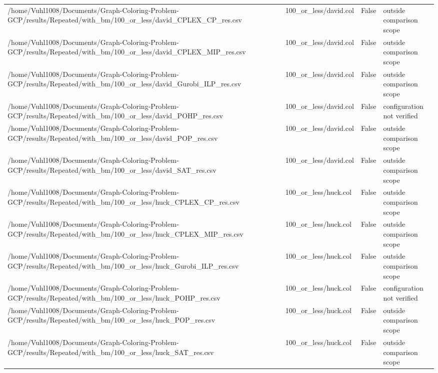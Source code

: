 \begin{table}[htbp]
\begin{tabular}{llll}
/home/Vuhl1008/Documents/Graph-Coloring-Problem-GCP/results/Repeated/with\_bm/100\_or\_less/david\_CPLEX\_CP\_res.csv & 100\_or\_less/david.col & False & outside comparison scope \\
/home/Vuhl1008/Documents/Graph-Coloring-Problem-GCP/results/Repeated/with\_bm/100\_or\_less/david\_CPLEX\_MIP\_res.csv & 100\_or\_less/david.col & False & outside comparison scope \\
/home/Vuhl1008/Documents/Graph-Coloring-Problem-GCP/results/Repeated/with\_bm/100\_or\_less/david\_Gurobi\_ILP\_res.csv & 100\_or\_less/david.col & False & outside comparison scope \\
/home/Vuhl1008/Documents/Graph-Coloring-Problem-GCP/results/Repeated/with\_bm/100\_or\_less/david\_POHP\_res.csv & 100\_or\_less/david.col & False & configuration not verified \\
/home/Vuhl1008/Documents/Graph-Coloring-Problem-GCP/results/Repeated/with\_bm/100\_or\_less/david\_POP\_res.csv & 100\_or\_less/david.col & False & outside comparison scope \\
/home/Vuhl1008/Documents/Graph-Coloring-Problem-GCP/results/Repeated/with\_bm/100\_or\_less/david\_SAT\_res.csv & 100\_or\_less/david.col & False & outside comparison scope \\
/home/Vuhl1008/Documents/Graph-Coloring-Problem-GCP/results/Repeated/with\_bm/100\_or\_less/huck\_CPLEX\_CP\_res.csv & 100\_or\_less/huck.col & False & outside comparison scope \\
/home/Vuhl1008/Documents/Graph-Coloring-Problem-GCP/results/Repeated/with\_bm/100\_or\_less/huck\_CPLEX\_MIP\_res.csv & 100\_or\_less/huck.col & False & outside comparison scope \\
/home/Vuhl1008/Documents/Graph-Coloring-Problem-GCP/results/Repeated/with\_bm/100\_or\_less/huck\_Gurobi\_ILP\_res.csv & 100\_or\_less/huck.col & False & outside comparison scope \\
/home/Vuhl1008/Documents/Graph-Coloring-Problem-GCP/results/Repeated/with\_bm/100\_or\_less/huck\_POHP\_res.csv & 100\_or\_less/huck.col & False & configuration not verified \\
/home/Vuhl1008/Documents/Graph-Coloring-Problem-GCP/results/Repeated/with\_bm/100\_or\_less/huck\_POP\_res.csv & 100\_or\_less/huck.col & False & outside comparison scope \\
/home/Vuhl1008/Documents/Graph-Coloring-Problem-GCP/results/Repeated/with\_bm/100\_or\_less/huck\_SAT\_res.csv & 100\_or\_less/huck.col & False & outside comparison scope \\

\end{tabular}
\end{table}
